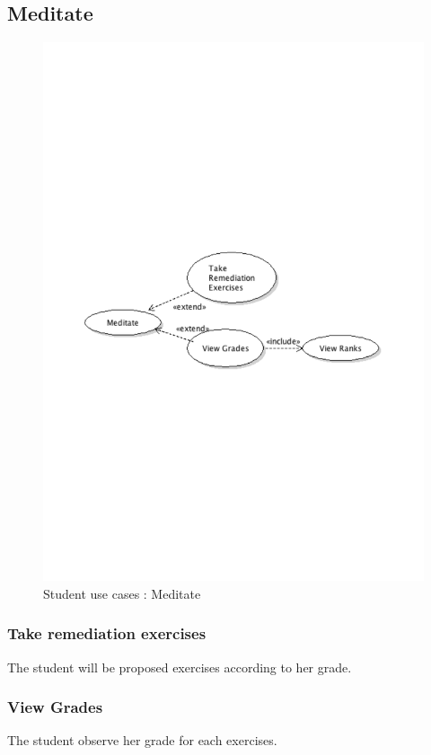 	\subsection{Meditate}
		\begin{figure}[ht]
			\begin{center}
				\includegraphics[width=\textwidth,  trim=2cm 12cm 2cm 12cm]{UML_figure/use_cases/student/UC_Student_Meditate.pdf}
				\caption{Student use cases : Meditate}
			\end{center}
		\end{figure}
		\subsubsection{Take remediation exercises}
			The student will be proposed exercises according to her grade.
		\subsubsection{View Grades}
			The student observe her grade for each exercises.
